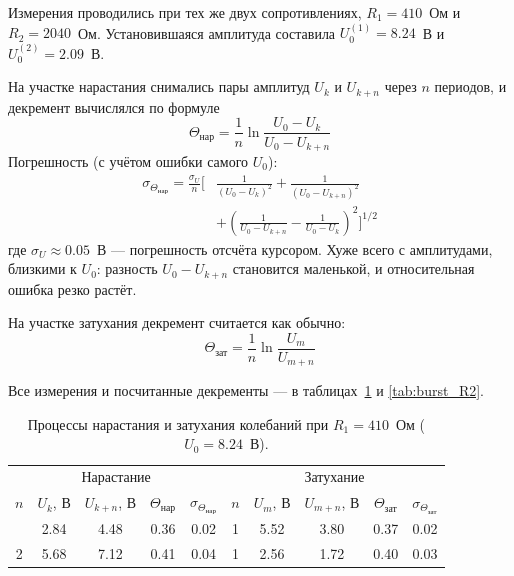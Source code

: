 \documentclass[reprint, amsmath, amssymb, aps, pra, nofootinbib]{revtex4-2}
\begin{document}
Измерения проводились при тех же двух сопротивлениях, $R_1 = 410$~Ом и $R_2 = 2040$~Ом. Установившаяся амплитуда составила $U_0^{(1)} = 8.24$~В и $U_0^{(2)} = 2.09$~В.

На участке нарастания снимались пары амплитуд $U_k$ и $U_{k+n}$ через $n$ периодов, и декремент вычислялся по формуле
\begin{equation}
    \Theta_{\text{нар}} = \frac{1}{n} \ln \frac{U_0 - U_k}{U_0 - U_{k+n}}
\end{equation}
Погрешность (с учётом ошибки самого $U_0$):
\begin{equation}
    \begin{split}
    \sigma_{\Theta_{\text{нар}}} = \frac{\sigma_U}{n} \Bigg[ &\frac{1}{(U_0 - U_k)^2} + \frac{1}{(U_0 - U_{k+n})^2} \\
    &+ \left( \frac{1}{U_0 - U_{k+n}} - \frac{1}{U_0 - U_k} \right)^2 \Bigg]^{1/2}
    \end{split}
\end{equation}
где $\sigma_U \approx 0.05$~В — погрешность отсчёта курсором. Хуже всего с амплитудами, близкими к $U_0$: разность $U_0 - U_{k+n}$ становится маленькой, и относительная ошибка резко растёт.

На участке затухания декремент считается как обычно:
\begin{equation}
    \Theta_{\text{зат}} = \frac{1}{n} \ln \frac{U_m}{U_{m+n}}
\end{equation}

Все измерения и посчитанные декременты — в таблицах~\ref{tab:burst_R1} и \ref{tab:burst_R2}. 

\squeezetable
\begin{table}[b!]
    \caption{Процессы нарастания и затухания колебаний при $R_1 = 410$~Ом ($U_0 = 8.24$~В).}
    \label{tab:burst_R1}
    \begin{ruledtabular}
        \begin{tabular}{ccccc|ccccc}
            \multicolumn{5}{c|}{Нарастание} & \multicolumn{5}{c}{Затухание} \\
            $n$ & $U_k$, В & $U_{k+n}$, В & $\Theta_{\text{нар}}$ & $\sigma_{\Theta_{\text{нар}}}$ & $n$ & $U_m$, В & $U_{m+n}$, В & $\Theta_{\text{зат}}$ & $\sigma_{\Theta_{\text{зат}}}$ \\
            \colrule
            1 & 2.84 & 4.48 & 0.36 & 0.02 & 1 & 5.52 & 3.80 & 0.37 & 0.02 \\
            2 & 5.68 & 7.12 & 0.41 & 0.04 & 1 & 2.56 & 1.72 & 0.40 & 0.03 \\
        \end{tabular}
    \end{ruledtabular}
\end{table}
\end{document}

